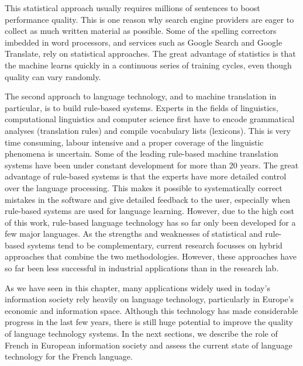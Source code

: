 \begin{multicols}{2}
This statistical approach usually requires millions of sentences to boost performance quality. This is one reason why search engine providers are eager to collect as much written material as possible. Some of the spelling correctors imbedded in word processors, and services such as Google Search and Google Translate, rely on statistical approaches. The great advantage of statistics is that the machine learns quickly in a continuous series of training cycles, even though quality can vary randomly.

The second approach to language technology, and to machine translation in particular, is to build rule-based systems. Experts in the fields of linguistics, computational linguistics and computer science first have to encode grammatical analyses (translation rules) and compile vocabulary lists (lexicons). This is very time consuming, labour intensive and a proper coverage of the linguistic phenomena is uncertain. Some of the leading rule-based machine translation systems have been under constant development for more than 20 years. The great advantage of rule-based systems is that the experts have more detailed control over the language processing. This makes it possible to systematically correct mistakes in the software and give detailed feedback to the user, especially when rule-based systems are used for language learning. However, due to the high cost of this work, rule-based language technology has so far only been developed for a few major languages. 
As the strengths and weaknesses of statistical and rule-based systems tend to be complementary, current research focusses on hybrid approaches that combine the two methodologies. However, these approaches have so far been less successful in industrial applications than in the research lab. 

As we have seen in this chapter, many applications widely used in
today's information society rely heavily on language technology,
particularly in Europe's economic and information space. Although this
technology has made considerable progress in the last few years, there
is still huge potential to improve the quality of language technology
systems. In the next sections, we describe the role of French in
European information society and assess the current state of language
technology for the French language.
\end{multicols}

